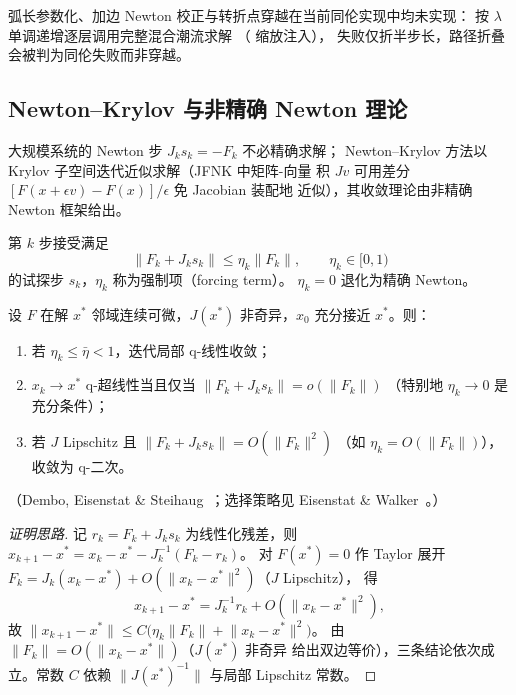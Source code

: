 \begin{gapnote}
弧长参数化、加边 Newton 校正与转折点穿越在当前同伦实现中均未实现：
按 $\lambda$ 单调递增逐层调用完整混合潮流求解
（ 缩放注入），
失败仅折半步长，路径折叠会被判为同伦失败而非穿越。
\end{gapnote}

\subsection{Newton--Krylov 与非精确 Newton 理论}\label{sec:pf-th-glob-nk}

大规模系统的 Newton 步 $J_k s_k=-F_k$ 不必精确求解；
Newton--Krylov 方法以 Krylov 子空间迭代近似求解（JFNK 中矩阵-向量
积 $Jv$ 可用差分 $[F(x+\epsilon v)-F(x)]/\epsilon$ 免 Jacobian 装配地
近似），其收敛理论由非精确 Newton 框架给出。

\begin{definition}\label{sec:pf-th-glob-def-inexact}
第 $k$ 步接受满足
\begin{equation}
\lVert F_k+J_k s_k\rVert\le\eta_k\lVert F_k\rVert,
\qquad \eta_k\in[0,1)
\end{equation}
的试探步 $s_k$，$\eta_k$ 称为强制项（forcing term）。
$\eta_k=0$ 退化为精确 Newton。
\end{definition}

\begin{theorem}\label{sec:pf-th-glob-thm-des}
设 $F$ 在解 $x^*$ 邻域连续可微，$J(x^*)$ 非奇异，$x_0$ 充分接近
$x^*$。则：
\begin{enumerate}
  \item 若 $\eta_k\le\bar\eta<1$，迭代局部 q-线性收敛；
  \item $x_k\to x^*$ q-超线性当且仅当
        $\lVert F_k+J_ks_k\rVert=o(\lVert F_k\rVert)$
       （特别地 $\eta_k\to0$ 是充分条件）；
  \item 若 $J$ Lipschitz 且
        $\lVert F_k+J_ks_k\rVert=O(\lVert F_k\rVert^2)$
        （如 $\eta_k=O(\lVert F_k\rVert)$），收敛为 q-二次。
\end{enumerate}
（Dembo, Eisenstat \& Steihaug~\cite{pfglob-des}；选择策略见
Eisenstat \& Walker~\cite{pfglob-ew}。）
\end{theorem}

\begin{proof}[证明思路]
记 $r_k=F_k+J_ks_k$ 为线性化残差，则
$x_{k+1}-x^*=x_k-x^*-J_k^{-1}(F_k-r_k)$。
对 $F(x^*)=0$ 作 Taylor 展开
$F_k=J_k(x_k-x^*)+O(\lVert x_k-x^*\rVert^2)$（$J$ Lipschitz），
得
\[
x_{k+1}-x^*
=J_k^{-1}r_k+O(\lVert x_k-x^*\rVert^2),
\]
故
$\lVert x_{k+1}-x^*\rVert
\le C\bigl(\eta_k\lVert F_k\rVert+\lVert x_k-x^*\rVert^2\bigr)$。
由 $\lVert F_k\rVert=O(\lVert x_k-x^*\rVert)$（$J(x^*)$ 非奇异
给出双边等价），三条结论依次成立。常数 $C$ 依赖
$\lVert J(x^*)^{-1}\rVert$ 与局部 Lipschitz 常数。
\end{proof}

